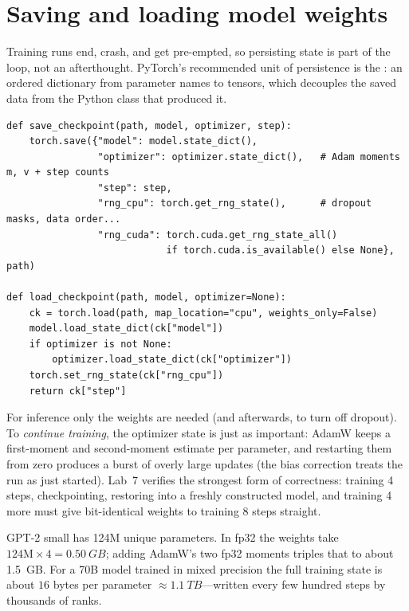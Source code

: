 \section{Saving and loading model weights}\label{sec:pretrain:save}

Training runs end, crash, and get pre-empted, so persisting state is part of the loop, not an
afterthought. PyTorch's recommended unit of persistence is the : an ordered
dictionary from parameter names to tensors, which decouples the saved data from the Python
class that produced it.

\begin{lstlisting}[caption={Saving and restoring \emph{all} training state (Lab 7, Task 5).},label={lst:pretrain:ckpt}]
def save_checkpoint(path, model, optimizer, step):
    torch.save({"model": model.state_dict(),
                "optimizer": optimizer.state_dict(),   # Adam moments m, v + step counts
                "step": step,
                "rng_cpu": torch.get_rng_state(),      # dropout masks, data order...
                "rng_cuda": torch.cuda.get_rng_state_all()
                            if torch.cuda.is_available() else None}, path)

def load_checkpoint(path, model, optimizer=None):
    ck = torch.load(path, map_location="cpu", weights_only=False)
    model.load_state_dict(ck["model"])
    if optimizer is not None:
        optimizer.load_state_dict(ck["optimizer"])
    torch.set_rng_state(ck["rng_cpu"])
    return ck["step"]
\end{lstlisting}

For inference only the weights are needed (and  afterwards, to turn off
dropout). To \emph{continue training}, the optimizer state is just as important: AdamW keeps a
first-moment and second-moment estimate per parameter, and restarting them from zero produces
a burst of overly large updates (the bias correction treats the run as just started). Lab~7
verifies the strongest form of correctness: training 4 steps, checkpointing, restoring into a
freshly constructed model, and training 4 more must give bit-identical weights to training 8
steps straight.

\begin{napkinmath}
GPT-2 small has 124M unique parameters. In fp32 the weights take $124\text{M}\times 4 =
\SI{0.50}{GB}$; adding AdamW's two fp32 moments triples that to about \SI{1.5}{GB}. For a 70B
model trained in mixed precision the full training state is about $16$ bytes per parameter
$\approx \SI{1.1}{TB}$---written every few hundred steps by thousands of ranks.
\end{napkinmath}

